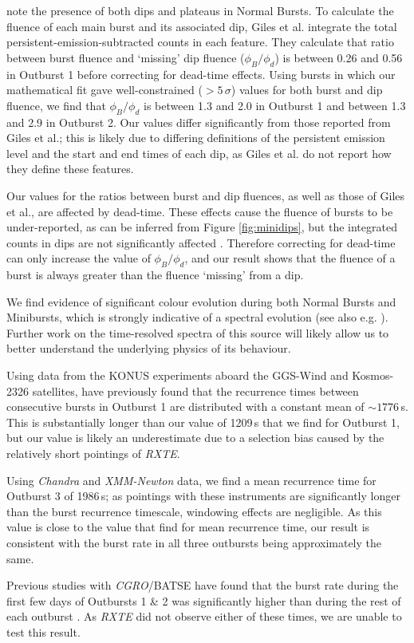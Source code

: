 \par \citet{Giles_BP} note the presence of both dips and plateaus in Normal Bursts.  To calculate the fluence of each main burst and its associated dip, Giles et al. integrate the total persistent-emission-subtracted counts in each feature.  They calculate that ratio between burst fluence and `missing' dip fluence ($\phi_{B}/\phi_{d}$) is between 0.26 and 0.56 in Outburst 1 before correcting for dead-time effects.  Using bursts in which our mathematical fit gave well-constrained ($>5\,\sigma$) values for both burst and dip fluence, we find that $\phi_{B}/\phi_{d}$ is between 1.3 and 2.0 in Outburst 1 and between 1.3 and 2.9 in Outburst 2.  Our values differ significantly from those reported from Giles et al.; this is likely due to differing definitions of the persistent emission level and the start and end times of each dip, as Giles et al. do not report how they define these features.
\par Our values for the ratios between burst and dip fluences, as well as those of Giles et al., are affected by dead-time.  These effects cause the fluence of bursts to be under-reported, as can be inferred from Figure \ref{fig:minidips}, but the integrated counts in dips are not significantly affected \citep{Giles_BP}.  Therefore correcting for dead-time can only increase the value of $\phi_{B}/\phi_{d}$, and our result shows that the fluence of a burst is always greater than the fluence `missing' from a dip.
\par We find evidence of significant colour evolution during both Normal Bursts and Minibursts, which is strongly indicative of a spectral evolution (see also e.g. \citealp{Woods_OB2}).  Further work on the time-resolved spectra of this source will likely allow us to better understand the underlying physics of its behaviour.
\par Using data from the KONUS experiments aboard the GGS-Wind and Kosmos-2326 satellites, \citet{Aptekar_Recur} have previously found that the recurrence times between consecutive bursts in Outburst 1 are distributed with a constant mean of $\sim1776$\,s.  This is substantially longer than our value of 1209\,s that we find for Outburst 1, but our value is likely an underestimate due to a selection bias caused by the relatively short pointings of \textit{RXTE}.
\par Using \textit{Chandra} and \textit{XMM-Newton} data, we find a mean recurrence time for Outburst 3 of 1986\,s; as pointings with these instruments are significantly longer than the burst recurrence timescale, windowing effects are negligible.  As this value is close to the value that \citet{Aptekar_Recur} find for mean recurrence time, our result is consistent with the burst rate in all three outbursts being approximately the same.
\par Previous studies with \textit{CGRO}/BATSE have found that the burst rate during the first few days of Outbursts 1 \& 2 was significantly higher than during the rest of each outburst \citep{Kouveliotou_BP,Woods_OB2}.  As \textit{RXTE} did not observe either of these times, we are unable to test this result.

